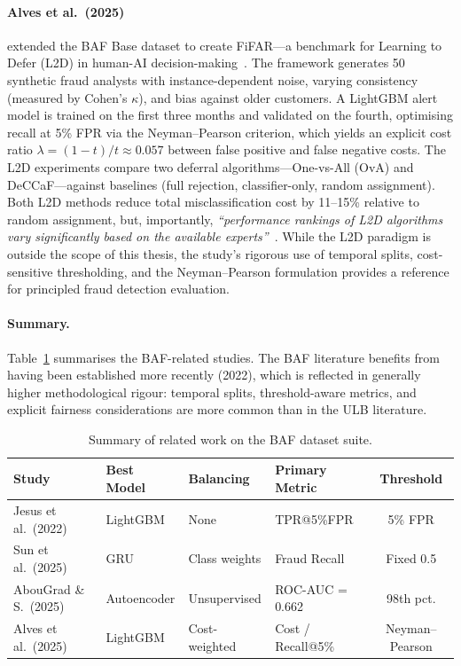 \paragraph{Alves et al.\ (2025)}
extended the BAF Base dataset to create FiFAR---a benchmark for Learning to Defer (L2D) in human-AI decision-making~\cite{alves2025benchmarking}. The framework generates 50 synthetic fraud analysts with instance-dependent noise, varying consistency (measured by Cohen's $\kappa$), and bias against older customers. A LightGBM alert model is trained on the first three months and validated on the fourth, optimising recall at 5\% FPR via the Neyman--Pearson criterion, which yields an explicit cost ratio $\lambda = (1-t)/t \approx 0.057$ between false positive and false negative costs. The L2D experiments compare two deferral algorithms---One-vs-All (OvA) and DeCCaF---against baselines (full rejection, classifier-only, random assignment). Both L2D methods reduce total misclassification cost by 11--15\% relative to random assignment, but, importantly, \emph{``performance rankings of L2D algorithms vary significantly based on the available experts''}~\cite{alves2025benchmarking}. While the L2D paradigm is outside the scope of this thesis, the study's rigorous use of temporal splits, cost-sensitive thresholding, and the Neyman--Pearson formulation provides a reference for principled fraud detection evaluation.

\paragraph{Summary.}
Table~\ref{tab:rw_baf_summary} summarises the BAF-related studies. The BAF literature benefits from having been established more recently (2022), which is reflected in generally higher methodological rigour: temporal splits, threshold-aware metrics, and explicit fairness considerations are more common than in the ULB literature.

\begin{table}[ht]
\centering
\caption{Summary of related work on the BAF dataset suite.}
\label{tab:rw_baf_summary}
\small
\begin{tabular}{l l l l c}
\toprule
Study & Best Model & Balancing & Primary Metric & Threshold \\
\midrule
Jesus et al.\ (2022)  & LightGBM    & None          & TPR@5\%FPR        & 5\% FPR  \\
Sun et al.\ (2025)    & GRU         & Class weights & Fraud Recall      & Fixed 0.5 \\
AbouGrad \& S.\ (2025) & Autoencoder & Unsupervised  & ROC-AUC = 0.662   & 98th pct. \\
Alves et al.\ (2025)  & LightGBM    & Cost-weighted & Cost / Recall@5\% & Neyman--Pearson \\
\bottomrule
\end{tabular}
\end{table}


